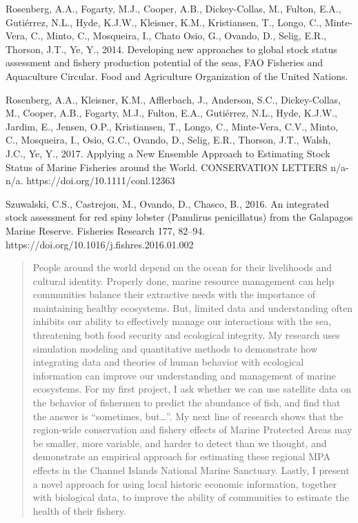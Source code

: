 \documentclass[twoside,12pt,final]{ucthesis-CA2012}
\begin{document}
\begin{ucfrontmatter}
\begin{vitae}
Rosenberg, A.A., Fogarty, M.J., Cooper, A.B., Dickey-Collas, M., Fulton, E.A., Gutiérrez, N.L., Hyde, K.J.W., Kleisner, K.M., Kristiansen, T., Longo, C., Minte-Vera, C., Minto, C., Mosqueira, I., Chato Osio, G., Ovando, D., Selig, E.R., Thorson, J.T., Ye, Y., 2014. Developing new approaches to global stock status assessment and fishery production potential of the seas, FAO Fisheries and Aquaculture Circular. Food and Agriculture Organization of the United Nations.

Rosenberg, A.A., Kleisner, K.M., Afflerbach, J., Anderson, S.C., Dickey-Collas, M., Cooper, A.B., Fogarty, M.J., Fulton, E.A., Gutiérrez, N.L., Hyde, K.J.W., Jardim, E., Jensen, O.P., Kristiansen, T., Longo, C., Minte-Vera, C.V., Minto, C., Mosqueira, I., Osio, G.C., Ovando, D., Selig, E.R., Thorson, J.T., Walsh, J.C., Ye, Y., 2017. Applying a New Ensemble Approach to Estimating Stock Status of Marine Fisheries around the World. CONSERVATION LETTERS n/a-n/a. https://doi.org/10.1111/conl.12363

Szuwalski, C.S., Castrejon, M., Ovando, D., Chasco, B., 2016. An integrated stock assessment for red spiny lobster (Panulirus penicillatus) from the Galapagos Marine Reserve. Fisheries Research 177, 82–94. https://doi.org/10.1016/j.fishres.2016.01.002


  \end{vitae}
  \begin{abstract}

    People around the world depend on the ocean for their livelihoods and
    cultural identity. Properly done, marine resource management can help
    communities balance their extractive needs with the importance of
    maintaining healthy ecosystems. But, limited data and understanding
    often inhibits our ability to effectively manage our interactions with
    the sea, threatening both food security and ecological integrity. My
    research uses simulation modeling and quantitative methods to
    demonstrate how integrating data and theories of human behavior with
    ecological information can improve our understanding and management of
    marine ecosystems. For my first project, I ask whether we can use
    satellite data on the behavior of fishermen to predict the abundance of
    fish, and find that the answer is ``sometimes, but\ldots{}''. My next
    line of research shows that the region-wide conservation and fishery
    effects of Marine Protected Areas may be smaller, more variable, and
    harder to detect than we thought, and demonstrate an empirical approach
    for estimating these regional MPA effects in the Channel Islands
    National Marine Sanctuary. Lastly, I present a novel approach for using
    local historic economic information, together with biological data, to
    improve the ability of communities to estimate the health of their
    fishery.

  \end{abstract}
	\tableofcontents
\end{ucfrontmatter}
\end{document}
